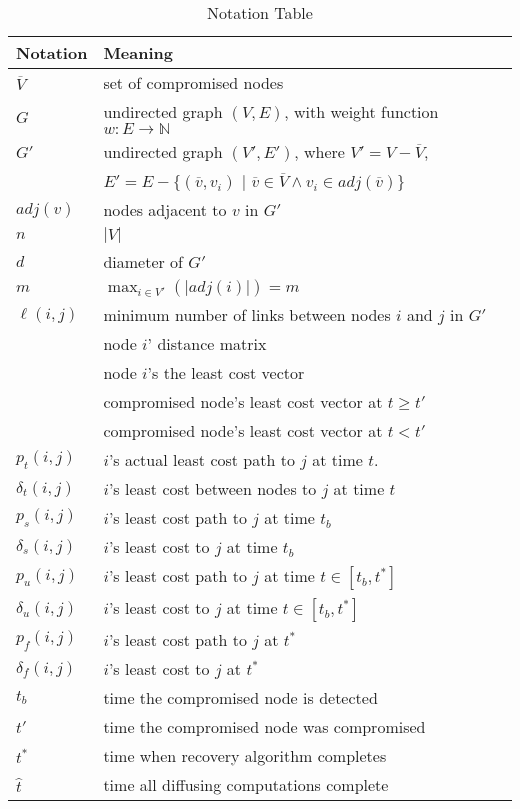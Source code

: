 \begin{table}[t]
\begin{center}
\begin{tabular}{l l} 
\hline \hline
   	{\bf Notation} & {\bf Meaning} \\
		  \hline 
			$\overline{V}$ & set of compromised nodes \\ 
		  	$G$ &  undirected graph $(V,E)$, with weight function $w: E \rightarrow \mathbb{N}$ \\
			$G'$ & undirected graph $(V',E')$, where $V' = V - \overline{V}$,  \\
			 & $E'=E - \{(\overline{v},v_i)$ $|$ $\overline{v} \in \overline{V} \wedge v_i \in adj(\overline{v}) \}$ \\
			$adj(v)$ & nodes adjacent to $v$ in $G'$ \\ 
 		 	$n$ & $|V|$ \\
			$d$ & diameter of $G'$  \\
			$m$ & $\displaystyle \max_{i \in V'}(|adj(i)|) = m$  \\
 			$\ell(i,j)$ & minimum number of links between nodes $i$ and $j$ in $G'$ \\
			\dmatrixi & node $i$' distance matrix \\
			\minvi & node $i$'s the least cost vector \\
			\badvector & compromised node's least cost vector at $t \geq t'$ \\ %
			\oldvector & compromised node's least cost vector at $t < t'$ \\ %
			\hline
			$p_t(i,j)$ & $i$'s actual least cost path to $j$ at time $t$. \\
			$\delta_t(i,j)$ & $i$'s least cost between nodes to $j$ at time $t$ \\
			$p_s(i,j)$ & $i$'s least cost path to $j$ at time $t_b$ \\
			$\delta_s(i,j)$ & $i$'s least cost to $j$ at time $t_b$ \\
			$p_u(i,j)$ & $i$'s least cost path to $j$ at time $t \in [t_b,t^*]$ \\
			$\delta_u(i,j)$ & $i$'s least cost to $j$ at time $t \in [t_b,t^*]$ \\
			$p_f(i,j)$ &  $i$'s least cost path to $j$ at $t^*$ \\
			$\delta_f(i,j)$ &  $i$'s least cost to $j$ at $t^*$ \\
			\hline
			$t_b$ & time the compromised node is detected \\
			$t'$ & time the compromised node was compromised \\
			$t^*$ & time when recovery algorithm completes \\
			$\hat{t}$ & time all diffusing computations complete \\
			\hline \hline
			\end{tabular}
			\end{center}
\caption{Notation Table}
\label{tab:abbrev}
\end{table}



